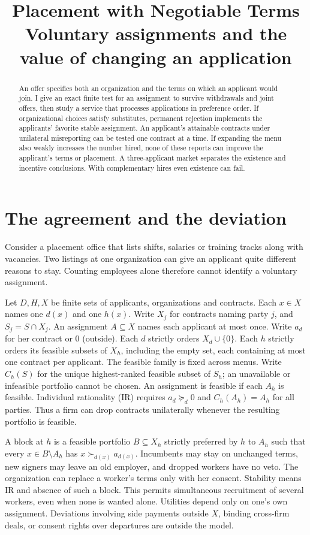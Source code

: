 \documentclass[11pt]{article}
\title{Placement with Negotiable Terms\\\large Voluntary assignments and the value of changing an application}
\author{}
\date{}
\begin{document}
\maketitle
\begin{abstract}
An offer specifies both an organization and the terms on which an applicant would join. I give an exact finite test for an assignment to survive withdrawals and joint offers, then study a service that processes applications in preference order. If organizational choices satisfy substitutes, permanent rejection implements the applicants' favorite stable assignment. An applicant's attainable contracts under unilateral misreporting can be tested one contract at a time. If expanding the menu also weakly increases the number hired, none of these reports can improve the applicant's terms or placement. A three-applicant market separates the existence and incentive conclusions. With complementary hires even existence can fail.
\end{abstract}

\section{The agreement and the deviation}
Consider a placement office that lists shifts, salaries or training tracks along with vacancies. Two listings at one organization can give an applicant quite different reasons to stay. Counting employees alone therefore cannot identify a voluntary assignment.

Let $D,H,X$ be finite sets of applicants, organizations and contracts. Each $x\in X$ names one $d(x)$ and one $h(x)$. Write $X_j$ for contracts naming party $j$, and $S_j=S\cap X_j$. An assignment $A\subseteq X$ names each applicant at most once. Write $a_d$ for her contract or $0$ (outside). Each $d$ strictly orders $X_d\cup\{0\}$. Each $h$ strictly orders its feasible subsets of $X_h$, including the empty set, each containing at most one contract per applicant. The feasible family is fixed across menus. Write $C_h(S)$ for the unique highest-ranked feasible subset of $S_h$; an unavailable or infeasible portfolio cannot be chosen. An assignment is feasible if each $A_h$ is feasible. Individual rationality (IR) requires $a_d\succeq_d0$ and $C_h(A_h)=A_h$ for all parties. Thus a firm can drop contracts unilaterally whenever the resulting portfolio is feasible.

A block at $h$ is a feasible portfolio $B\subseteq X_h$ strictly preferred by $h$ to $A_h$ such that every $x\in B\setminus A_h$ has $x\succ_{d(x)}a_{d(x)}$. Incumbents may stay on unchanged terms, new signers may leave an old employer, and dropped workers have no veto. The organization can replace a worker's terms only with her consent. Stability means IR and absence of such a block. This permits simultaneous recruitment of several workers, even when none is wanted alone. Utilities depend only on one's own assignment. Deviations involving side payments outside $X$, binding cross-firm deals, or consent rights over departures are outside the model.
\end{document}
